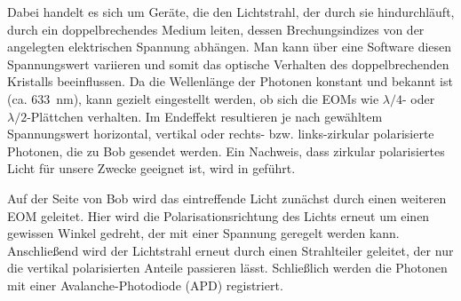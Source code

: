 Dabei handelt es sich um Geräte, die den Lichtstrahl, der durch sie
hindurchläuft, durch ein doppelbrechendes Medium leiten, dessen
Brechungsindizes von der angelegten elektrischen Spannung abhängen. Man kann
über eine Software diesen Spannungswert variieren und somit das optische
Verhalten des doppelbrechenden Kristalls beeinflussen. Da die Wellenlänge der
Photonen konstant und bekannt ist (ca. \SI{633}{nm}), kann gezielt eingestellt
werden, ob sich die EOMs wie $λ/4$- oder $λ/2$-Plättchen verhalten. Im
Endeffekt resultieren je nach gewähltem Spannungswert horizontal, vertikal oder
rechts- bzw. links-zirkular polarisierte Photonen, die zu Bob gesendet werden.
Ein Nachweis, dass zirkular polarisiertes Licht für unsere Zwecke geeignet ist,
wird in \textcolor{red}{} geführt.

Auf der Seite von Bob wird das eintreffende Licht zunächst durch einen weiteren
EOM geleitet. Hier wird die Polarisationsrichtung des Lichts erneut um einen
gewissen Winkel gedreht, der mit einer Spannung geregelt werden kann.
Anschließend wird der Lichtstrahl erneut durch einen Strahlteiler geleitet, der
nur die vertikal polarisierten Anteile passieren lässt. Schließlich werden die
Photonen mit einer Avalanche-Photodiode (APD) registriert.
